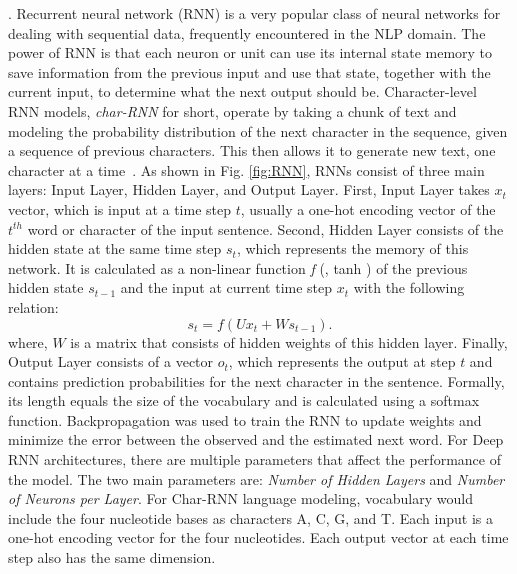 .
Recurrent neural network (RNN) is a very popular class of neural networks for dealing with sequential data, frequently encountered in the NLP domain. The power of RNN is that each neuron or unit can use its internal state memory to save information from the previous input and use that state, together with the current input, to determine what the next output should be. %
Character-level RNN models, \textit{char-RNN} for short, operate by taking a chunk of text and modeling the probability distribution of the next character in the sequence, given a sequence of previous characters. This then allows it to generate new text, one character at a time~\citep{graves2013generating}.
As shown in Fig. \ref{fig:RNN}, RNNs consist of three main layers: Input Layer, Hidden Layer, and Output Layer.
First, Input Layer takes $ x_{t} $ vector, which is input at a time step $t$, usually a one-hot encoding vector of the $ t^{th} $ word or character of the input sentence. 
Second, Hidden Layer consists of the hidden state at the same time step $ s_{t} $, which represents the memory of this network. It is calculated as a non-linear function \textit{f} (\eg, tanh ) of the previous hidden state $ s_{t-1} $ and the input at current time step $ x_{t} $ with the following relation: \begin{equation}
s_{t} = f(U x_{t} + W s_{t-1}).
\end{equation}
where, $W$ is a matrix that consists of hidden weights of this hidden layer.
Finally, Output Layer consists of a vector $ o_{t} $, which represents the output at step $t$ and contains prediction probabilities for the next character in the sentence. Formally, its length equals the size of the vocabulary and is calculated using a softmax function.
Backpropagation was used to train the RNN to update weights and minimize the error between the observed and the estimated next word. For Deep RNN architectures, there are multiple parameters that affect the performance of the model. The two main parameters are: \textit{Number of Hidden Layers} and \textit{Number of Neurons per Layer}. For Char-RNN language modeling, vocabulary would include the four nucleotide bases as characters {A, C, G, and T}. Each input is a one-hot encoding vector for the four nucleotides.
Each output vector at each time step also has the same dimension.  


